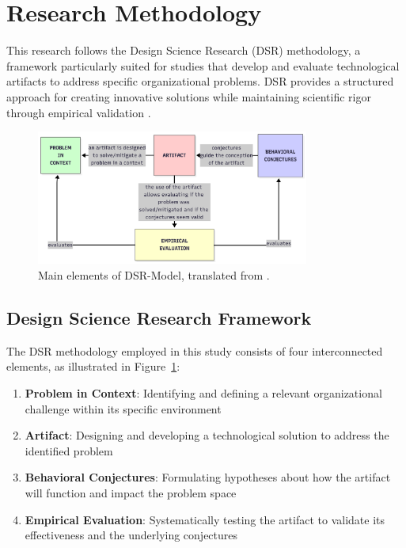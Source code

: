\section{Research Methodology}
  
    This research follows the Design Science Research (DSR) methodology, a framework particularly suited for studies that develop and evaluate technological artifacts to address specific organizational problems. DSR provides a structured approach for creating innovative solutions while maintaining scientific rigor through empirical validation \citep{hevner2007three}.
    
    \begin{figure}[h]
    \centering
    \includegraphics[width=0.8\textwidth]{images/dsr-model.png}
    \caption{Main elements of DSR-Model, translated from \citet{Oswald2023}.}
    \label{fig:dsr-model}
    \end{figure}
    
    \subsection{Design Science Research Framework}
    
        The DSR methodology employed in this study consists of four interconnected elements, as illustrated in Figure~\ref{fig:dsr-model}:
        
        \begin{enumerate}
        \item \textbf{Problem in Context}: Identifying and defining a relevant organizational challenge within its specific environment
        \item \textbf{Artifact}: Designing and developing a technological solution to address the identified problem
        \item \textbf{Behavioral Conjectures}: Formulating hypotheses about how the artifact will function and impact the problem space
        \item \textbf{Empirical Evaluation}: Systematically testing the artifact to validate its effectiveness and the underlying conjectures
        \end{enumerate}
        
